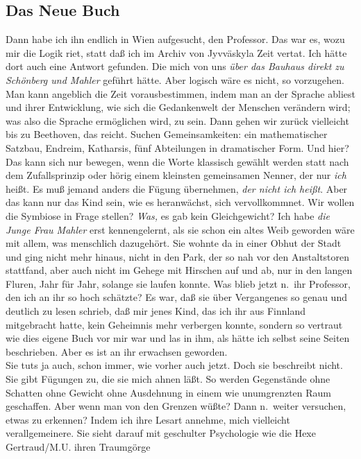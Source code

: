\documentclass[
]{article}
\author{}
\date{\vspace{-2.5em}}
\begin{document}
\subsection{Das Neue Buch}\label{das-neue-buch}

Dann habe ich ihn endlich in Wien aufgesucht, den Professor. Das war es,
wozu mir die Logik riet, statt daß ich im Archiv von Jyvväskyla Zeit
vertat. Ich hätte dort auch eine Antwort gefunden. Die mich von uns
\emph{über das Bauhaus direkt zu Schönberg und Mahler} geführt hätte.
Aber logisch wäre es nicht, so vorzugehen. Man kann angeblich die Zeit
vorausbestimmen, indem man an der Sprache abliest und ihrer Entwicklung,
wie sich die Gedankenwelt der Menschen verändern wird; was also die
Sprache ermöglichen wird, zu sein. Dann gehen wir zurück vielleicht bis
zu Beethoven, das reicht. Suchen Gemeinsamkeiten: ein mathematischer
Satzbau, Endreim, Katharsis, fünf Abteilungen in dramatischer Form. Und
hier? Das kann sich nur bewegen, wenn die Worte klassisch gewählt werden
statt nach dem Zufallsprinzip oder hörig einem kleinsten gemeinsamen
Nenner, der nur \emph{ich} heißt. Es muß jemand anders die Fügung
übernehmen, \emph{der nicht ich heißt}. Aber das kann nur das Kind sein,
wie es heranwächst, sich vervollkommnet. Wir wollen die Symbiose in
Frage stellen? \emph{Was, }es gab kein Gleichgewicht? Ich habe \emph{die
Junge Frau Mahler} erst kennengelernt, als sie schon ein altes Weib
geworden wäre mit allem, was menschlich dazugehört. Sie wohnte da in
einer Obhut der Stadt und ging nicht mehr hinaus, nicht in den Park, der
so nah vor den Anstaltstoren stattfand, aber auch nicht im Gehege mit
Hirschen auf und ab, nur in den langen Fluren, Jahr für Jahr, solange
sie laufen konnte. Was blieb jetzt n.~ihr Professor, den ich an ihr so
hoch schätzte? Es war, daß sie über Vergangenes so genau und deutlich zu
lesen schrieb, daß mir jenes Kind, das ich ihr aus Finnland mitgebracht
hatte, kein Geheimnis mehr verbergen konnte, sondern so vertraut wie
dies eigene Buch vor mir war und las in ihm, als hätte ich selbst seine
Seiten beschrieben. Aber es ist an ihr erwachsen geworden.\\
Sie tuts ja auch, schon immer, wie vorher auch jetzt. Doch sie
beschreibt nicht. Sie gibt Fügungen zu, die sie mich ahnen läßt. So
werden Gegenstände ohne Schatten ohne Gewicht ohne Ausdehnung in einem
wie unumgrenzten Raum geschaffen. Aber wenn man von den Grenzen wüßte?
Dann n.~weiter versuchen, etwas zu erkennen? Indem ich ihre Lesart
annehme, mich vielleicht verallgemeinere. Sie sieht darauf mit
geschulter Psychologie wie die Hexe Gertraud/M.U. ihren Traumgörge
\end{document}

